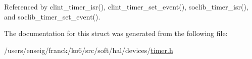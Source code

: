 Referenced by clint\-\_\-timer\-\_\-isr(), clint\-\_\-timer\-\_\-set\-\_\-event(), soclib\-\_\-timer\-\_\-isr(), and soclib\-\_\-timer\-\_\-set\-\_\-event().



The documentation for this struct was generated from the following file\-:\begin{DoxyCompactItemize}
\item 
/users/enseig/franck/ko6/src/soft/hal/devices/\hyperlink{timer_8h}{timer.\-h}\end{DoxyCompactItemize}
